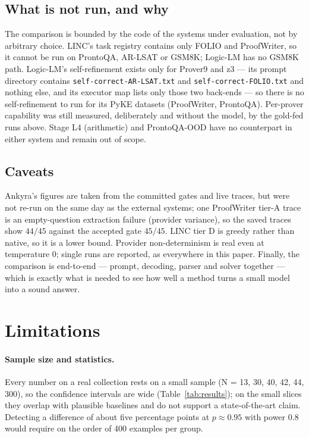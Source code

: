 \documentclass[11pt,a4paper]{article}
\begin{document}
\subsection{What is not run, and why}
\label{sec:comparison-notrun}

The comparison is bounded by the code of the systems under evaluation, not by arbitrary
choice. LINC's task registry contains only FOLIO and ProofWriter, so it cannot be run on
ProntoQA, AR-LSAT or GSM8K; Logic-LM has no GSM8K path. Logic-LM's self-refinement exists
only for Prover9 and z3 --- its prompt directory contains
\texttt{self-correct-AR-LSAT.txt} and \texttt{self-correct-FOLIO.txt} and nothing else, and
its executor map lists only those two back-ends --- so there is no self-refinement to run
for its PyKE datasets (ProofWriter, ProntoQA). Per-prover capability was still measured,
deliberately and without the model, by the gold-fed runs above. Stage L4 (arithmetic) and
ProntoQA-OOD have no counterpart in either system and remain out of scope.

\subsection{Caveats}
\label{sec:comparison-caveats}

Ankyra's figures are taken from the committed gates and live traces, but were not re-run on
the same day as the external systems; one ProofWriter tier-A trace is an empty-question
extraction failure (provider variance), so the saved traces show $44/45$ against the
accepted gate $45/45$. LINC tier D is greedy rather than native, so it is a lower bound.
Provider non-determinism is real even at temperature $0$; single runs are reported, as
everywhere in this paper. Finally, the comparison is end-to-end --- prompt, decoding, parser
and solver together --- which is exactly what is needed to see how well a method turns a
small model into a sound answer.

\section{Limitations}
\label{sec:limitations}

\paragraph{Sample size and statistics.} Every number on a real collection rests on a small
sample (N = 13, 30, 40, 42, 44, 300), so the confidence intervals are wide
(Table~\ref{tab:results}); on the small slices they overlap with plausible baselines and do
not support a state-of-the-art claim. Detecting a difference of about five percentage points
at $p\approx0.95$ with power $0.8$ would require on the order of 400 examples per group.
\end{document}
